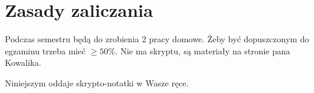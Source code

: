 \section{Zasady zaliczania}

Podczas semestru będą do zrobienia 2 pracy domowe. Żeby być dopuszczonym do egzaminu trzeba mieć $\ge 50\%$. Nie ma skryptu, są materiały na stronie pana Kowalika.

Niniejszym oddaje skrypto-notatki w Wasze ręce.
\clearpage